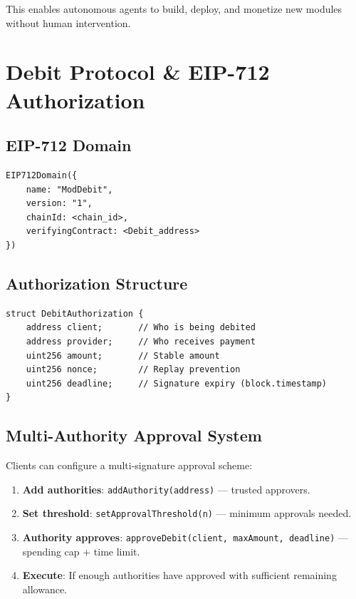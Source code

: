 \documentclass[11pt,a4paper]{article}
\begin{document}
This enables autonomous agents to build, deploy, and monetize new modules without human intervention.

\section{Debit Protocol \& EIP-712 Authorization}
\label{sec:debit}

\subsection{EIP-712 Domain}

\begin{lstlisting}[style=solidity]
EIP712Domain({
    name: "ModDebit",
    version: "1",
    chainId: <chain_id>,
    verifyingContract: <Debit_address>
})
\end{lstlisting}

\subsection{Authorization Structure}

\begin{lstlisting}[style=solidity]
struct DebitAuthorization {
    address client;       // Who is being debited
    address provider;     // Who receives payment
    uint256 amount;       // Stable amount
    uint256 nonce;        // Replay prevention
    uint256 deadline;     // Signature expiry (block.timestamp)
}
\end{lstlisting}

\subsection{Multi-Authority Approval System}

Clients can configure a multi-signature approval scheme:
\begin{enumerate}
    \item \textbf{Add authorities}: \texttt{addAuthority(address)} --- trusted approvers.
    \item \textbf{Set threshold}: \texttt{setApprovalThreshold(n)} --- minimum approvals needed.
    \item \textbf{Authority approves}: \texttt{approveDebit(client, maxAmount, deadline)} --- spending cap + time limit.
    \item \textbf{Execute}: If enough authorities have approved with sufficient remaining allowance.
\end{enumerate}
\end{document}
